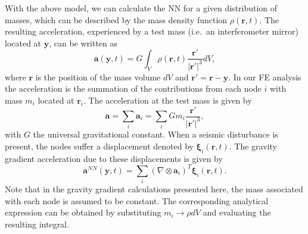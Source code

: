 With the above model, we can calculate the NN for a given distribution of masses, which can be described by the mass density function $\rho(\mathbf{r},t)$. The resulting acceleration, experienced by a test mass (i.e.\ an interferometer mirror) located at $\mathbf{y}$, can be written as
\begin{equation}
\mathbf{a}(\mathbf{y},t) = G \int_V \rho(\mathbf{r},t) \frac{\mathbf{r'}}{|\mathbf{r'}|^3}dV,
\label{eq3.42}
\end{equation}
where $\mathbf{r}$ is the position of the mass volume $dV$ and $\mathbf{r'}=\mathbf{r}-\mathbf{y}$.
In our FE analysis the acceleration is the summation of the contributions from each node $i$ with mass $m_i$ located at $\mathbf{r}_i$. The acceleration at the test mass is given by
\begin{equation}
\mathbf{a} = \sum_i \mathbf{a}_i = \sum_i  G m_i \frac{\mathbf{r'}}{|\mathbf{r'}|^3},
\label{eq3.43}
\end{equation}
with $G$ the universal gravitational constant. When a seismic disturbance is present, the nodes suffer a displacement denoted by $\mathbf{\xi}_i(\mathbf{r},t)$. The gravity gradient acceleration due to these displacements is given by
\begin{equation}
\mathbf{a}^{NN}(\mathbf{y},t) = \sum_i (\nabla\otimes\mathbf{a}_i)^T \mathbf{\xi}_i(\mathbf{r},t).
\label{eq3.44}
\end{equation}
Note that in the gravity gradient calculations presented here, the mass associated with each node is assumed to be constant. The corresponding analytical expression can be obtained by substituting $m_i \rightarrow \rho dV$ and evaluating the resulting integral.



